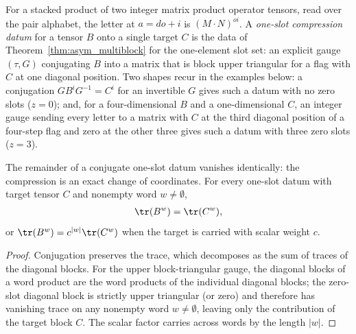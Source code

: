 \begin{definition}%
    \label{def:asymex_one_slot}
    \leanok
    For a stacked product of two integer matrix product operator tensors,
    read over the pair alphabet, the letter at $a=do+i$ is
    $(M\mathbin{\cdot}N)^{oi}$. A \emph{one-slot compression datum} for a
    tensor $B$ onto a single target $C$ is the data of
    Theorem~\ref{thm:asym_multiblock} for the one-element slot set: an
    explicit gauge $(\tau,G)$ conjugating $B$ into a matrix that is block
    upper triangular for a flag with $C$ at one diagonal position. Two
    shapes recur in the examples below: a conjugation $GB^iG^{-1}=C^i$ for
    an invertible $G$ gives such a datum with no zero slots ($z=0$); and,
    for a four-dimensional $B$ and a one-dimensional $C$, an integer gauge
    sending every letter to a matrix with $C$ at the third diagonal
    position of a four-step flag and zero at the other three gives such a
    datum with three zero slots ($z=3$).
\end{definition}

\begin{lemma}%
    \label{thm:asymex_one_slot}
    \leanok
    The remainder of a conjugate one-slot datum vanishes identically: the
    compression is an exact change of coordinates. For every one-slot
    datum with target tensor $C$ and nonempty word $w \ne \emptyset$,
    \begin{align}
        \tr(B^w) = \tr(C^w), \notag
    \end{align}
    or $\tr(B^w) = c^{|w|}\tr(C^w)$ when the target is carried with scalar
    weight $c$.
\end{lemma}

\begin{proof}
    \leanok
    Conjugation preserves the trace, which decomposes as the sum of traces of
    the diagonal blocks. For the upper block-triangular gauge, the diagonal
    blocks of a word product are the word products of the individual diagonal
    blocks; the zero-slot diagonal block is strictly upper triangular (or zero)
    and therefore has vanishing trace on any nonempty word $w \ne \emptyset$,
    leaving only the contribution of the target block $C$. The scalar factor
    carries across words by the length $|w|$.
\end{proof}

